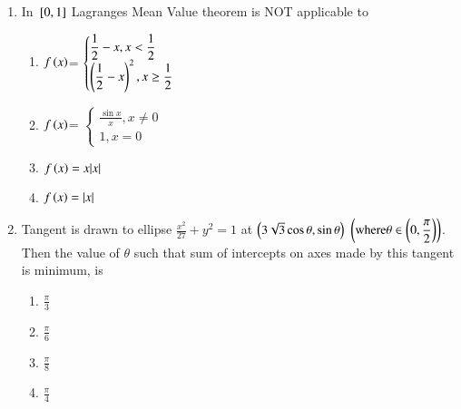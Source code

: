 \documentclass[journal,12pt,twocolumn]{IEEEtran}
\theoremstyle{remark}
\begin{document}
\begin{enumerate}[start=9]
\item In ${}\left[0,1\right]$ Lagranges Mean Value theorem is NOT applicable to
\hfill {}

\begin{enumerate}
    \item $f\left(x\right)$=
    $\begin{cases}
         \displaystyle\frac{1}{2}-x, x<\displaystyle\frac{1}{2}\\
	    \left(\displaystyle\frac{1}{2}-x\right)^2, x\geq \displaystyle\frac{1}{2}
    \end{cases}$\\
    \item $f\left(x\right)$=
    $\begin{cases}
	    \displaystyle\frac{\sin{x}}{x}, x\neq 0\\
        1, x=0
    \end{cases}$\\
    \item $f\left(x\right)=x|x|$
    \item $f\left(x\right)=|x|$\\
\end{enumerate}
\item Tangent is drawn to ellipse $\displaystyle\frac{x^2}{27}+y^2 = 1$ at $\left(3\sqrt{3}\cos{\theta},\sin{\theta}\right)$ $\left(\text{where}  \theta \in \left(0,\displaystyle\frac{\pi}{2}\right)\right)$. Then the value of $\theta$ such that sum of intercepts on axes made by this tangent is minimum, is
\hfill {}
\begin{enumerate}
    \item $\displaystyle\frac{\pi}{3}$\\
    \item $\displaystyle\frac{\pi}{6}$\\
    \item $\displaystyle\frac{\pi}{8}$\\
    \item $\displaystyle\frac{\pi}{4}$\\
 \end{enumerate}
\end{enumerate}
\end{document}
